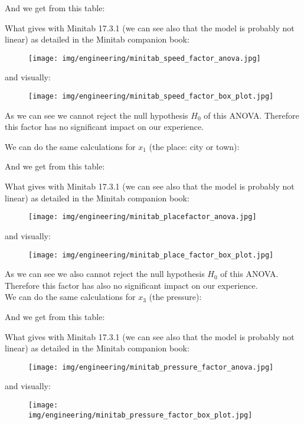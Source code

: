 	And we get from this table:
	
	What gives with Minitab 17.3.1 (we can see also that the model is probably not linear) as detailed in the Minitab companion book:
	\begin{figure}[H]
		\begin{center}
		\texttt{[image: img/engineering/minitab\_speed\_factor\_anova.jpg]}
		\end{center}	
	\end{figure}
	and visually:
	\begin{figure}[H]
		\begin{center}
		\texttt{[image: img/engineering/minitab\_speed\_factor\_box\_plot.jpg]}
		\end{center}	
	\end{figure}	
	
	As we can see we cannot reject the null hypothesis $H_0$ of this ANOVA. Therefore this factor has no significant impact on our experience.
	
	We can do the same calculations for $x_1$ (the place: city or town):
	
	And we get from this table:
	
	What gives with Minitab 17.3.1 (we can see also that the model is probably not linear) as detailed in the Minitab companion book:
	\begin{figure}[H]
		\begin{center}
		\texttt{[image: img/engineering/minitab\_placefactor\_anova.jpg]}
		\end{center}	
	\end{figure}
	and visually:
	\begin{figure}[H]
		\begin{center}
		\texttt{[image: img/engineering/minitab\_place\_factor\_box\_plot.jpg]}
		\end{center}	
	\end{figure}	
	As we can see we also cannot reject the null hypothesis $H_0$ of this ANOVA. Therefore this factor has also no significant impact on our experience.\\
	
	We can do the same calculations for $x_3$ (the pressure):
	
	And we get from this table:
	
	What gives with Minitab 17.3.1 (we can see also that the model is probably not linear) as detailed in the Minitab companion book:
	\begin{figure}[H]
		\begin{center}
		\texttt{[image: img/engineering/minitab\_pressure\_factor\_anova.jpg]}
		\end{center}	
	\end{figure}
	and visually:
	\begin{figure}[H]
		\begin{center}
		\texttt{[image: img/engineering/minitab\_pressure\_factor\_box\_plot.jpg]}
		\end{center}	
	\end{figure}

